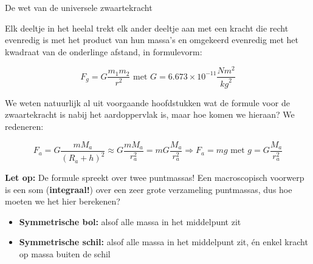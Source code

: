 \begin{theo}{De wet van de universele zwaartekracht}

Elk deeltje in het heelal trekt elk ander deeltje aan met een kracht die recht evenredig is met het product van hun massa’s en omgekeerd evenredig met het kwadraat van de onderlinge afstand, in formulevorm:
 
 \begin{equation*}
     F_g = G\dfrac{m_1m_2}{r^2} \text{ met } G = 6.673 \times 10^{-11} \dfrac{Nm^2}{{kg}^2}
 \end{equation*}
 
\noindent We weten natuurlijk al uit voorgaande hoofdstukken wat de formule voor de zwaartekracht is nabij het aardoppervlak is, maar hoe komen we hieraan? We redeneren:

\begin{equation*}
    F_a = G\dfrac{mM_a}{(R_a+h)^2} \approx G\dfrac{mM_a}{r_a^2} = mG\dfrac{M_a}{r_a^2} \Rightarrow F_a = mg \text{ met } g = G\dfrac{M_a}{r_a^2}
\end{equation*}



\vspace{0.3cm}
\noindent \textbf{Let op:} De formule spreekt over twee puntmassas! Een macroscopisch voorwerp is een som (\textbf{integraal!}) over een zeer grote verzameling puntmassas, dus hoe moeten we het hier berekenen?
\begin{itemize}
    \item \textbf{Symmetrische bol:} alsof alle massa in het middelpunt zit
    \item \textbf{Symmetrische schil:} alsof alle massa in het middelpunt zit, én enkel kracht op massa buiten de schil
\end{itemize}

\end{theo}

